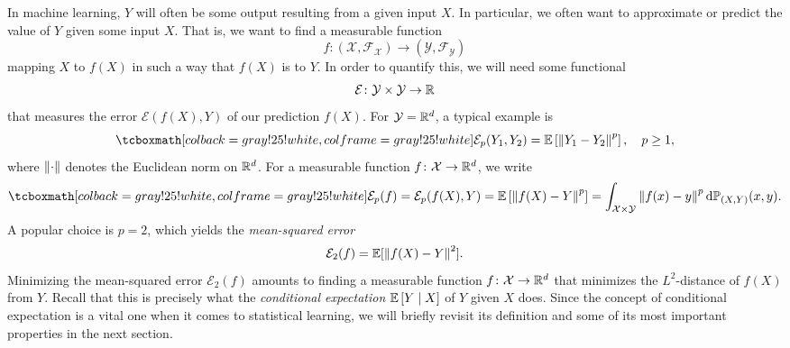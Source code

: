 In machine learning, $Y$ will often be some output resulting from a given input $X$. In particular, we often want to approximate or predict the value of $Y$ given some input $X$. That is, we want to find a measurable function
\[
    f \colon (\mathcal{X}, \mathcal{F}_{\mathcal{X}}) \to (\mathcal{Y}, \mathcal{F}_{\mathcal{Y}})
\]
mapping $X$ to $f(X)$ in such a way that $f(X)$ is  to $Y$. In order to quantify this, we will need some functional
\[
    \mathcal{E} \colon \mathcal{Y} \times \mathcal{Y} \to \mathbb{R}
\]
that measures the error $\mathcal{E}(f(X), Y)$ of our prediction $f(X)$. For $\mathcal{Y} = \mathbb{R}^d$, a typical example is
\[
    \highlightMath{
        \mathcal{E}_p(Y_1, Y_2) = \Ex{\norm{Y_1 - Y_2}^p}, \quad p \geq 1,
    }
\]
where $\norm{\cdot}$ denotes the Euclidean norm on $\mathbb{R}^d$. For a measurable function $f \colon \mathcal{X} \to \mathbb{R}^d$, we write
\[
    \highlightMath{
        \mathcal{E}_p(f) = \mathcal{E}_p(f(X), Y) = \Ex{\norm{f(X) - Y}^p} = \int_{\mathcal{X} \times \mathcal{Y}} \norm{f(x) - y}^p \dP{(X, Y)}{x, y}.
    }
\]
A popular choice is $p = 2$, which yields the \emph{mean-squared error}
\[
    \mathcal{E}_2(f) = \mathbb{E}[\norm{f(X) - Y}^2].
\]
Minimizing the mean-squared error $\mathcal{E}_2(f)$ amounts to finding a measurable function $f \colon \mathcal{X} \to \mathbb{R}^d$ that minimizes the $L^2$-distance of $f(X)$ from $Y$. Recall that this is precisely what the \emph{conditional expectation} $\mathbb{E}\left[Y \mathrel{|} X\right]$ of $Y$ given $X$ does. Since the concept of conditional expectation is a vital one when it comes to statistical learning, we will briefly revisit its definition and some of its most important properties in the next section.
